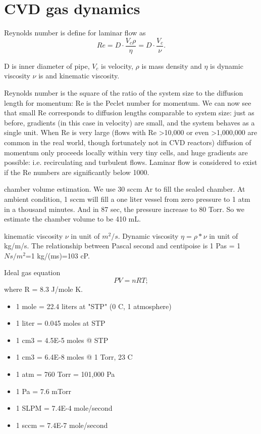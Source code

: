 \chapter{CVD gas dynamics}

Reynolds number is define for laminar flow as
\[
Re = D \cdot \frac{ V_c \rho}{\eta} = D \cdot \frac{ V_c }{\nu}.
\]

D is inner diameter of pipe, $V_c$ is velocity, $\rho$ is mass density and $\eta$ is dynamic viscosity $\nu$ is and kinematic viscosity. 

Reynolds number is the square of the ratio of the system size to the diffusion length for momentum: Re is the Peclet number for momentum. We can now see that small Re corresponds to diffusion lengths comparable to system size: just as before, gradients (in this case in velocity) are small, and the system behaves as a single unit. When Re is very large (flows with Re \textgreater 10,000 or even \textgreater 1,000,000 are common in the real world, though fortunately not in CVD reactors) diffusion of momentum only proceeds locally within very tiny cells, and huge gradients are possible: i.e. recirculating and turbulent flows. Laminar flow is considered to exist if the Re numbers are significantly below 1000.

chamber volume estimation. We use 30 sccm Ar to fill the sealed chamber. At ambient condition, 1 sccm will fill a one liter vessel from zero pressure to 1 atm in a thousand minutes. And in 87 sec, the pressure increase to 80 Torr. So we estimate the chamber volume to be 410 mL.

kinematic viscosity $\nu$ in unit of $m^2/s$. Dynamic viscosity $\eta = \rho*\nu$ in unit of kg/m/s. The relationship between Pascal second and centipoise is 1 Pas = 1 $Ns/m^2$=1 kg/(ms)=103 cP.

Ideal gas equation
\[
PV = n R T;
\]
where R = 8.3 J/mole K.

\begin{itemize}
\item 1 mole = 22.4 liters at "STP" (0 C, 1 atmosphere)
\item 1 liter = 0.045 moles at STP
\item 1 cm3 = 4.5E-5 moles @ STP
\item 1 cm3 = 6.4E-8 moles @ 1 Torr, 23 C
\item 1 atm = 760 Torr = 101,000 Pa
\item 1 Pa = 7.6 mTorr
\item 1 SLPM = 7.4E-4 mole/second
\item 1 sccm = 7.4E-7 mole/second
\end{itemize}

